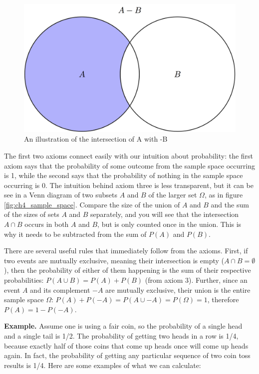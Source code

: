 \documentclass[
]{book}
\theoremstyle{definition}
\theoremstyle{definition}
\theoremstyle{definition}
\theoremstyle{remark}
\begin{document}
\begin{figure}
\centering
\includegraphics{ch4/set_subtraction.png}
\caption{An illustration of the intersection of A with -B}
\end{figure}

The first two axioms connect easily with our intuition about probability: the first axiom says that the probability of some outcome from the sample space occurring is 1, while the second says that the probability of nothing in the sample space occurring is 0. The intuition behind axiom three is less transparent, but it can be see in a Venn diagram of two subsets \(A\) and \(B\) of the larger set \(\Omega\), as in figure \ref{fig:ch4_sample_space}. Compare the size of the union of \(A\) and \(B\) and the sum of the sizes of sets \(A\) and \(B\) separately, and you will see that the intersection \(A\cap B\) occurs in both \(A\) and \(B\), but is only counted once in the union. This is why it needs to be subtracted from the sum of \(P(A)\) and \(P(B)\).

There are several useful rules that immediately follow from the axioms. First, if two events are mutually exclusive, meaning their intersection is empty (\(A\cap B = \emptyset\)), then the probability of either of them happening is the sum of their respective probabilities: \(P(A \cup B) = P(A) + P(B)\) (from axiom 3). Further, since an event \(A\) and its complement \(-A\) are mutually exclusive, their union is the entire sample space \(\Omega\): \(P(A) + P(-A) = P(A \cup -A) = P(\Omega) = 1\), therefore \(P(A) = 1-P(-A)\).

\textbf{Example.} Assume one is using a fair coin, so the probability of a single head and a single tail is 1/2. The probability of getting two heads in a row is 1/4, because exactly half of those coins that come up heads once will come up heads again. In fact, the probability of getting any particular sequence of two coin toss results is 1/4. Here are some examples of what we can calculate:
\end{document}
